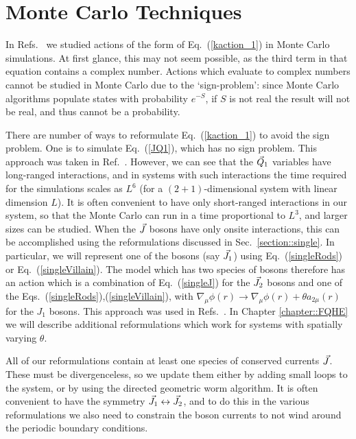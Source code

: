 \section{Monte Carlo Techniques}

In Refs.~\cite{Loopy,short_range3,Gen2Loops,FQHE} we studied actions of the form of Eq.~(\ref{kaction_1}) in Monte Carlo simulations. At first glance, this may not seem possible, as the third term in that equation contains a complex number. Actions which evaluate to complex numbers cannot be studied in Monte Carlo due to the `sign-problem': since Monte Carlo algorithms populate states with probability $e^{-S}$, if $S$ is not real the result will not be real, and thus cannot be a probability.

There are number of ways to reformulate Eq.~(\ref{kaction_1}) to avoid the sign problem. One is to simulate Eq.~(\ref{JQ1}), which has no sign problem. This approach was taken in Ref.~\cite{Gen2Loops}. However, we can see that the $\vec{Q}_1$ variables have long-ranged interactions, and in systems with such interactions the time required for the simulations scales as $L^6$ (for a $(2+1)$-dimensional system with linear dimension $L$). It is often convenient to have only short-ranged interactions in our system, so that the Monte Carlo can run in a time proportional to $L^3$, and larger sizes can be studied. 
When the $\vec{J}$ bosons have only onsite interactions, this can be accomplished using the reformulations discussed in Sec.~\ref{section::single}. In particular, we will represent one of the bosons (say $\vec{J}_1$) using Eq.~(\ref{singleRods}) or Eq.~(\ref{singleVillain}). The model which has two species of bosons therefore has an action which is a combination of Eq.~(\ref{singleJ}) for the $\vec{J}_2$ bosons and one of the Eqs.~(\ref{singleRods}),(\ref{singleVillain}), with $\nabla_\mu\phi(r)\rightarrow\nabla_\mu\phi(r)+\theta a_{2\mu}(r)$ for the $J_1$ bosons. This approach was used in Refs.~\cite{Loopy,short_range3}. 
In Chapter \ref{chapter::FQHE} we will describe additional reformulations which work for systems with spatially varying $\theta$. 

All of our reformulations contain at least one species of conserved currents $\vec{J}$. These must be divergenceless, so we update them either by adding small loops to the system, or by using the directed geometric worm algorithm\cite{Sorensen}. It is often convenient to have the symmetry $\vec{J}_1\leftrightarrow\vec{J}_2$, and to do this in the various reformulations we also need to constrain the boson currents to not wind around the periodic boundary conditions.

